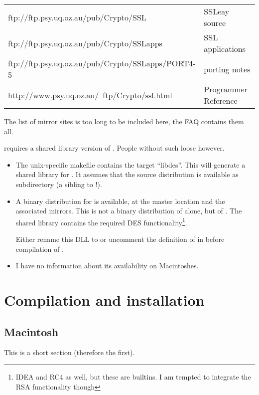 {\small \begin {tabular} {|l|l|}\hline
     ftp://ftp.psy.uq.oz.au/pub/Crypto/SSL & SSLeay source \\
     ftp://ftp.psy.uq.oz.au/pub/Crypto/SSLapps & SSL applications \\
     ftp://ftp.psy.uq.oz.au/pub/Crypto/SSLapps/PORT4-5 & porting notes \\
     http://www.psy.uq.oz.au/~ftp/Crypto/ssl.html & Programmer Reference \\ \hline
\end {tabular}}\vspace {1em}

The list of mirror sites is too long to be included here, the FAQ
contains them all.


\trf{} requires a shared library version of . People
without such  loose however.

\begin {itemize}
\item	The unix-specific makefile contains the target ``libdes''. This
	will generate a shared library for . It assumes that the
	 source distribution is available as subdirectory
	 (a sibling to  !).

\item	A binary distribution for \win{} is available, at the master
	location and the associated mirrors. This is not a binary
	distribution of  alone, but of . The
	shared library  contains the required DES
	functionality\footnote {IDEA and RC4 as well, but these are
	\trf {} builtins. I am tempted to integrate the RSA
	functionality though}.

	Either rename this DLL to  or uncomment the
	definition of  in  before
	compilation of \trf {}.

\item	I have no information about its availability on Macintoshes.
\end   {itemize}


\chapter {Compilation and installation}
\section {Macintosh}

	This is a short section (therefore the first).

